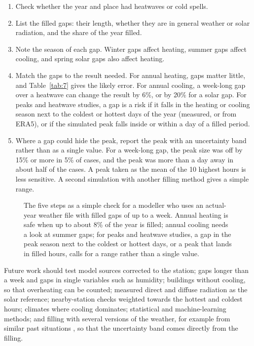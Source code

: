 \begin{enumerate}
\item
  Check whether the year and place had heatwaves or cold spells.
\item
  List the filled gaps: their length, whether they are in general weather or solar radiation, and the share of the year filled.
\item
  Note the season of each gap. Winter gaps affect heating, summer gaps affect cooling, and spring solar gaps also affect heating.
\item
  Match the gaps to the result needed. For annual heating, gaps matter little, and Table~\ref{tab:7} gives the likely error. For annual cooling, a week-long gap over a heatwave can change the result by 6\%, or by 20\% for a solar gap. For peaks and heatwave studies, a gap is a risk if it falls in the heating or cooling season next to the coldest or hottest days of the year (measured, or from ERA5), or if the simulated peak falls inside or within a day of a filled period.
\item
  Where a gap could hide the peak, report the peak with an uncertainty band rather than as a single value. For a week-long gap, the peak size was off by 15\% or more in 5\% of cases, and the peak was more than a day away in about half of the cases. A peak taken as the mean of the 10 highest hours is less sensitive. A second simulation with another filling method gives a simple range.
\end{enumerate}

\begin{figure}[tbp]
\centering
{}
\caption{The five steps as a simple check for a modeller who uses an actual-year weather file with filled gaps of up to a week. Annual heating is safe when up to about 8\% of the year is filled; annual cooling needs a look at summer gaps; for peaks and heatwave studies, a gap in the peak season next to the coldest or hottest days, or a peak that lands in filled hours, calls for a range rather than a single value.}
\label{fig:16}
\end{figure}

Future work should test model sources corrected to the station; gaps longer than a week and gaps in single variables such as humidity; buildings without cooling, so that overheating can be counted; measured direct and diffuse radiation as the solar reference; nearby-station checks weighted towards the hottest and coldest hours; climates where cooling dominates; statistical and machine-learning methods; and filling with several versions of the weather, for example from similar past situations \citep{dellemonache2013}, so that the uncertainty band comes directly from the filling.
